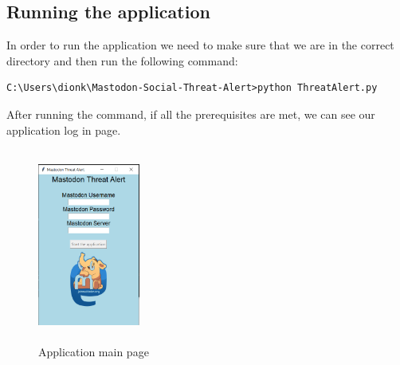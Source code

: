 \subsection{Running the application}
\label{ss:running_app}
In order to run the application we need to make sure that
we are in the correct directory and then run the following command:
\begin{lstlisting}[caption=Running the application, captionpos=b]
	C:\Users\dionk\Mastodon-Social-Threat-Alert>python ThreatAlert.py 
\end{lstlisting}

After running the command, if all the prerequisites are met, we can see 
our application log in page.
\begin{figure}[H]
	\centering
	\includegraphics[width=0.3\textwidth,height=240px]{images/mainpageapp.png}
	\caption{Application main page}
	\label{fig:empty_page}
\end{figure}

